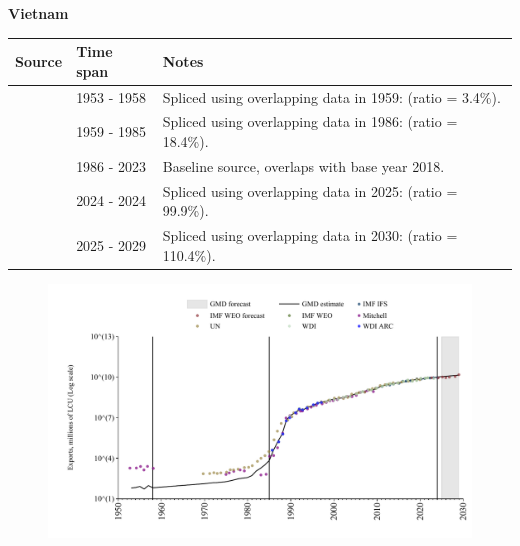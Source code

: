 \documentclass[12pt,a4paper,landscape]{article}
\begin{document}
\begin{adjustbox}{max totalsize={\paperwidth}{\paperheight},center}
\begin{minipage}[t][\textheight][t]{\textwidth}
\vspace*{0.5cm}
{}
\begin{center}
{\Large\bfseries Vietnam}
\end{center}
\vspace{0.5cm}
\begin{table}[H]
\centering
\small
\begin{tabular}{|l|l|l|}
\hline
\textbf{Source} & \textbf{Time span} & \textbf{Notes} \\
\hline
\rowcolor{white}\cite{Mitchell}& 1953 - 1958 &Spliced using overlapping data in 1959: (ratio = 3.4\%).\\
\rowcolor{lightgray}\cite{UN}& 1959 - 1985 &Spliced using overlapping data in 1986: (ratio = 18.4\%).\\
\rowcolor{white}\cite{WDI}& 1986 - 2023 &Baseline source, overlaps with base year 2018.\\
\rowcolor{lightgray}\cite{IMF_IFS}& 2024 - 2024 &Spliced using overlapping data in 2025: (ratio = 99.9\%).\\
\rowcolor{white}\cite{IMF_WEO_forecast}& 2025 - 2029 &Spliced using overlapping data in 2030: (ratio = 110.4\%).\\
\hline
\end{tabular}
\end{table}
\begin{figure}[H]
\centering
\includegraphics[width=\textwidth,height=0.6\textheight,keepaspectratio]{graphs/VNM_exports.pdf}
\end{figure}
\end{minipage}
\end{adjustbox}
\end{document}
